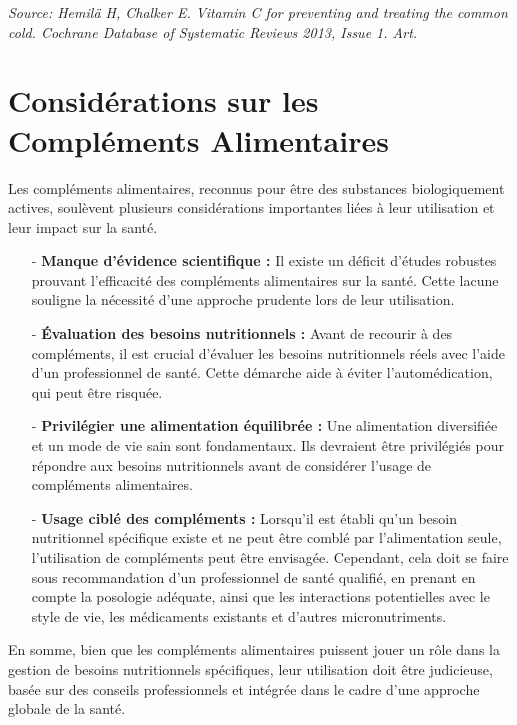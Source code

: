 \documentclass[11pt]{article}
\begin{document}
\textit{Source: Hemilä H, Chalker E. Vitamin C for preventing and treating the common cold. Cochrane Database of Systematic Reviews 2013, Issue 1. Art.}

\section{Considérations sur les Compléments Alimentaires}

Les compléments alimentaires, reconnus pour être des substances biologiquement actives, soulèvent plusieurs considérations importantes liées à leur utilisation et leur impact sur la santé.

\begin{itemize}
    \item[-] \textbf{Manque d'évidence scientifique :} Il existe un déficit d'études robustes prouvant l'efficacité des compléments alimentaires sur la santé. Cette lacune souligne la nécessité d'une approche prudente lors de leur utilisation.
    
    \item[-] \textbf{Évaluation des besoins nutritionnels :} Avant de recourir à des compléments, il est crucial d'évaluer les besoins nutritionnels réels avec l'aide d'un professionnel de santé. Cette démarche aide à éviter l'automédication, qui peut être risquée.
    
    \item[-] \textbf{Privilégier une alimentation équilibrée :} Une alimentation diversifiée et un mode de vie sain sont fondamentaux. Ils devraient être privilégiés pour répondre aux besoins nutritionnels avant de considérer l'usage de compléments alimentaires.
    
    \item[-] \textbf{Usage ciblé des compléments :} Lorsqu'il est établi qu'un besoin nutritionnel spécifique existe et ne peut être comblé par l'alimentation seule, l'utilisation de compléments peut être envisagée. Cependant, cela doit se faire sous recommandation d'un professionnel de santé qualifié, en prenant en compte la posologie adéquate, ainsi que les interactions potentielles avec le style de vie, les médicaments existants et d'autres micronutriments.
\end{itemize}

En somme, bien que les compléments alimentaires puissent jouer un rôle dans la gestion de besoins nutritionnels spécifiques, leur utilisation doit être judicieuse, basée sur des conseils professionnels et intégrée dans le cadre d'une approche globale de la santé.
\end{document}
